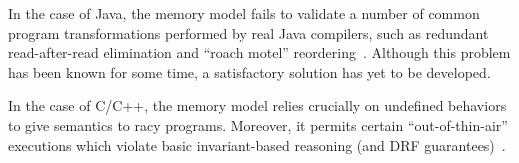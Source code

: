 In the case of Java, the memory model fails to validate a number of
common program transformations performed by real Java compilers, such
as redundant read-after-read elimination and ``roach motel''
reordering~\cite{sevcik:jmm}.  Although this problem has been known
for some time, a satisfactory solution has yet to be developed.

In the case of C/C++, the memory model relies crucially on undefined
behaviors to give semantics to racy programs.  Moreover, it permits
certain ``out-of-thin-air'' executions which violate basic
invariant-based reasoning (and DRF guarantees)~\cite{Boehm2014}.





